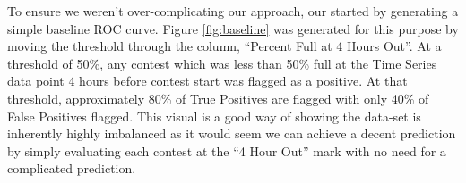 To ensure we weren't over-complicating our approach, our started by generating a simple baseline ROC curve. Figure \ref{fig:baseline} was generated for this purpose by moving the threshold through the column, ``Percent Full at 4 Hours Out''. At a threshold of 50\%, any contest which was less than 50\% full at the Time Series data point 4 hours before contest start was flagged as a positive. At that threshold, approximately 80\% of True Positives are flagged with only 40\% of False Positives flagged. This visual is a good way of showing the data-set is inherently highly imbalanced as it would seem we can achieve a decent prediction by simply evaluating each contest at the ``4 Hour Out'' mark with no need for a complicated prediction.


